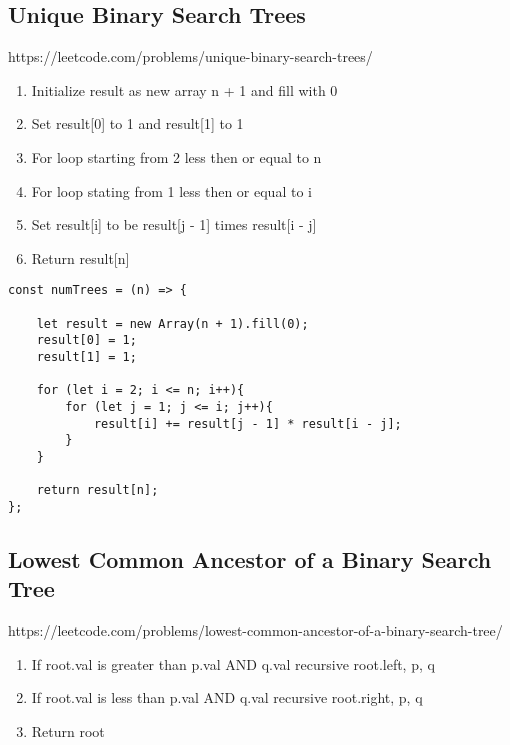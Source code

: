 \documentclass[10pt]{article}
\begin{document}
\pagebreak
\medskip   
\subsection {Unique Binary Search Trees}
https://leetcode.com/problems/unique-binary-search-trees/

\begin{enumerate}
	\item Initialize result as new array n + 1 and fill with 0   
	\item Set result[0] to 1 and result[1] to 1
	\item  For loop starting from 2 less then or equal to n
	\item For loop stating from 1 less then or equal to i 
	\item  Set result[i] to be result[j - 1] times result[i - j]
	\item Return result[n]
\end{enumerate}

\begin{lstlisting}[title=Solution numTrees, captionpos=t]
const numTrees = (n) => {
    
    let result = new Array(n + 1).fill(0);
    result[0] = 1;
    result[1] = 1;
    
    for (let i = 2; i <= n; i++){
        for (let j = 1; j <= i; j++){
            result[i] += result[j - 1] * result[i - j];
        }
    }
    
    return result[n];
};
\end{lstlisting}

\medskip %















\pagebreak
\medskip   
\subsection {Lowest Common Ancestor of a Binary Search Tree}
https://leetcode.com/problems/lowest-common-ancestor-of-a-binary-search-tree/

\begin{enumerate}
	\item If root.val is greater than p.val AND q.val recursive root.left, p, q
	\item If root.val is less than p.val AND q.val recursive root.right, p, q 
	\item Return root
\end{enumerate}
\end{document}
